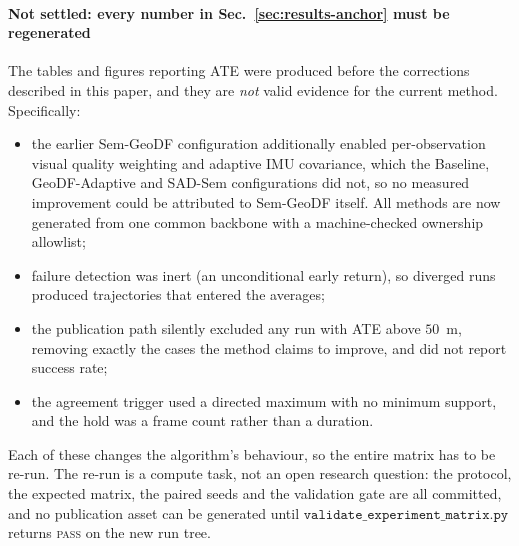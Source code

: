 \documentclass{ieeeaccess}
\begin{document}
\paragraph{Not settled: every number in Sec.~\ref{sec:results-anchor} must be regenerated}
The tables and figures reporting ATE were produced before the corrections described in this paper, and they are \emph{not} valid evidence for the current method. Specifically:
\begin{itemize}
\item the earlier Sem-GeoDF configuration additionally enabled per-observation visual quality weighting and adaptive IMU covariance, which the Baseline, GeoDF-Adaptive and SAD-Sem configurations did not, so no measured improvement could be attributed to Sem-GeoDF itself. All methods are now generated from one common backbone with a machine-checked ownership allowlist;
\item failure detection was inert (an unconditional early return), so diverged runs produced trajectories that entered the averages;
\item the publication path silently excluded any run with ATE above \(50\)~m, removing exactly the cases the method claims to improve, and did not report success rate;
\item the agreement trigger used a directed maximum with no minimum support, and the hold was a frame count rather than a duration.
\end{itemize}
Each of these changes the algorithm's behaviour, so the entire matrix has to be re-run. The re-run is a compute task, not an open research question: the protocol, the expected matrix, the paired seeds and the validation gate are all committed, and no publication asset can be generated until \(\texttt{validate\_experiment\_matrix.py}\) returns \textsc{pass} on the new run tree.
\end{document}
